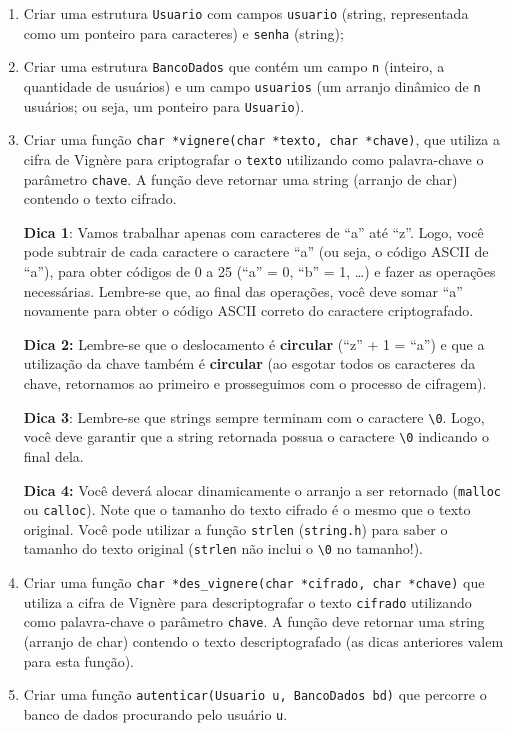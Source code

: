 \documentclass[a4paper, 11pt]{article}
\begin{document}
\begin{enumerate}
\item Criar uma estrutura \texttt{Usuario} com campos \texttt{usuario} (string, representada
como um ponteiro para caracteres) e \texttt{senha} (string);
\item Criar uma estrutura \texttt{BancoDados} que contém um campo \texttt{n} (inteiro, a quantidade de usuários)
e um campo \texttt{usuarios} (um arranjo dinâmico de \texttt{n} usuários; ou seja, um ponteiro para \texttt{Usuario}).
\item Criar uma função \texttt{char *vignere(char *texto, char *chave)}, que
utiliza a cifra de Vignère para criptografar o \texttt{texto} utilizando como
palavra-chave o parâmetro \texttt{chave}. A função deve retornar uma string
(arranjo de char) contendo o texto cifrado.

\textbf{Dica 1}: Vamos trabalhar apenas com caracteres de ``a'' até ``z''. Logo, você pode
subtrair de cada caractere o caractere ``a'' (ou seja, o código ASCII de ``a''), para
obter códigos de 0 a 25 (``a'' = 0, ``b'' = 1, \ldots{}) e fazer as operações
necessárias. Lembre-se que, ao final das operações, você deve somar ``a''
novamente para obter o código ASCII correto do caractere criptografado.

\textbf{Dica 2:} Lembre-se que o deslocamento é \textbf{circular} (``z'' + 1 = ``a'') e que a utilização
da chave também é \textbf{circular} (ao esgotar todos os caracteres da chave, retornamos
ao primeiro e prosseguimos com o processo de cifragem).

\textbf{Dica 3}: Lembre-se que strings sempre terminam com o caractere \texttt{\textbackslash{}0}. Logo, você deve
garantir que a string retornada possua o caractere \texttt{\textbackslash{}0} indicando o final dela.

\textbf{Dica 4:} Você deverá alocar dinamicamente o arranjo a ser retornado
(\texttt{malloc} ou \texttt{calloc}). Note que o tamanho do texto cifrado é o mesmo que
o texto original. Você pode utilizar a função \texttt{strlen} (\texttt{string.h}) para
saber o tamanho do texto original (\texttt{strlen} não inclui o \texttt{\textbackslash{}0} no tamanho!).

\item Criar uma função \texttt{char *des\_vignere(char *cifrado, char *chave)}
que utiliza a cifra de Vignère para descriptografar o texto \texttt{cifrado}
utilizando como palavra-chave o parâmetro \texttt{chave}. A função deve retornar uma
string (arranjo de char) contendo o texto descriptografado
(as dicas anteriores valem para esta função).
\item Criar uma função \texttt{autenticar(Usuario u, BancoDados bd)} que percorre o
banco de dados procurando pelo usuário \texttt{u}.


\end{enumerate}
\end{document}

